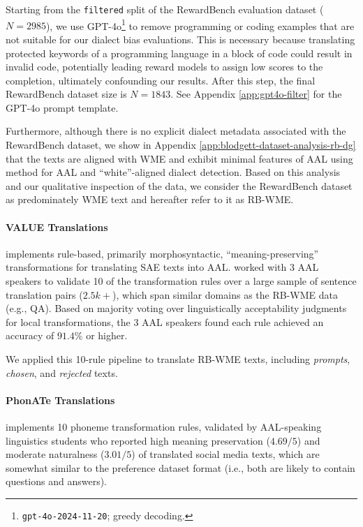 Starting from the \texttt{filtered} split of the RewardBench evaluation dataset ($N=2985$), we use GPT-4o\footnote{\texttt{gpt-4o-2024-11-20}; greedy decoding.} to remove programming or coding examples that are not suitable for our dialect bias evaluations. This is necessary because translating protected keywords of a programming language in a block of code could result in invalid code, potentially leading reward models to assign low scores to the completion, ultimately confounding our results. After this step, the final RewardBench dataset size is $N=1843$. See Appendix \ref{app:gpt4o-filter} for the GPT-4o prompt template. 

Furthermore, although there is no explicit dialect metadata associated with the RewardBench dataset, we show in Appendix \ref{app:blodgett-dataset-analysis-rb-dg} that the texts are aligned with WME and exhibit minimal features of AAL using  method for AAL and ``white''-aligned dialect detection. Based on this analysis and our qualitative inspection of the data, we consider the RewardBench dataset as predominately WME text and hereafter refer to it as \textsc{RB-WME}.

\paragraph{VALUE Translations} \citet{ziems_value_2022} implements rule-based, primarily morphosyntactic, ``meaning-preserving'' transformations for translating SAE texts into AAL. \citet{ziems_value_2022} worked with 3 AAL speakers to validate 10 of the transformation rules over a large sample of sentence translation pairs ($2.5k+$), which span similar domains as the \textsc{RB-WME} data (e.g., QA). Based on majority voting over linguistically acceptability judgments for local transformations, the 3 AAL speakers found each rule achieved an accuracy of $91.4\%$ or higher. 

We applied this 10-rule pipeline to translate \textsc{RB-WME} texts, including \textit{prompts}, \textit{chosen}, and \textit{rejected} texts.

\paragraph{PhonATe Translations} \citet{deas2024phonate} implements 10 phoneme transformation rules, validated by AAL-speaking linguistics students who reported high meaning preservation ($4.69/5$) and moderate naturalness ($3.01/5$) of translated social media texts, which are somewhat similar to the preference dataset format (i.e., both are likely to contain questions and answers).


